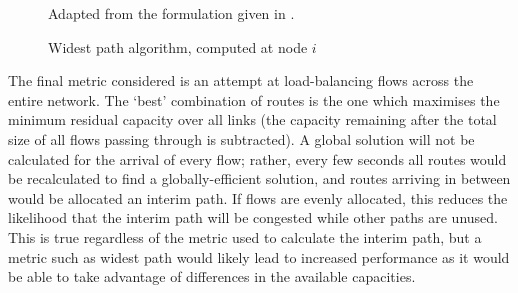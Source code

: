 \begin{figure}
\caption{Widest path algorithm, computed at node $i$}
\label{fig:medhi}
\centering
Adapted from the formulation given in \cite{medhi:routing}.
\end{figure}



The final metric considered is an attempt at load-balancing flows across the entire network. The `best' combination of routes is the one which maximises the minimum residual capacity over all links (the capacity remaining after the total size of all flows passing through is subtracted). A global solution will not be calculated for the arrival of every flow; rather, every few seconds all routes would be recalculated to find a globally-efficient solution, and routes arriving in between would be allocated an interim path. If flows are evenly allocated, this reduces the likelihood that the interim path will be congested while other paths are unused. This is true regardless of the metric used to calculate the interim path, but a metric such as widest path would likely lead to increased performance as it would be able to take advantage of differences in the available capacities.

